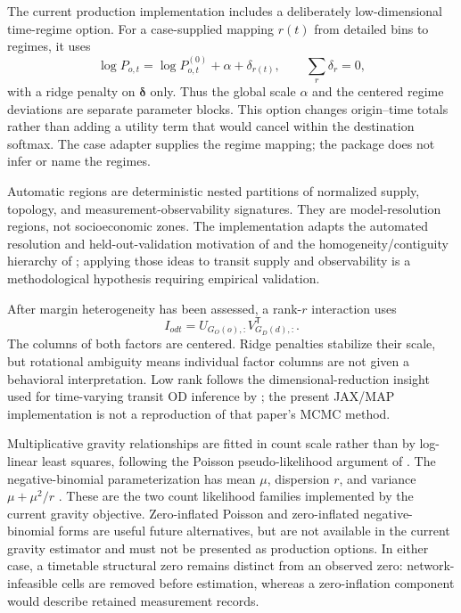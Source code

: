 The current production implementation includes a deliberately low-dimensional
time-regime option.  For a case-supplied mapping $r(t)$ from detailed bins to
regimes, it uses
\[
    \log P_{o,t}=\log P^{(0)}_{o,t}+\alpha+\delta_{r(t)},
    \qquad \sum_r\delta_r=0,
\]
with a ridge penalty on $\bm\delta$ only.  Thus the global scale $\alpha$ and
the centered regime deviations are separate parameter blocks.  This option
changes origin--time totals rather than adding a utility term that would cancel
within the destination softmax.  The case adapter supplies the regime mapping;
the package does not infer or name the regimes.

Automatic regions are deterministic nested partitions of normalized supply,
topology, and measurement-observability signatures.  They are model-resolution
regions, not socioeconomic zones.  The implementation adapts the automated
resolution and held-out-validation motivation of \cite{MenonEtAl2015} and the
homogeneity/contiguity hierarchy of \cite{YuanEtAl2019}; applying those ideas to
transit supply and observability is a methodological hypothesis requiring
empirical validation.

After margin heterogeneity has been assessed, a rank-$r$ interaction uses
\[
 I_{odt}=U_{G_O(o),:}V_{G_D(d),:}^{\mathsf T}.
\]
The columns of both factors are centered.  Ridge penalties stabilize their
scale, but rotational ambiguity means individual factor columns are not given
a behavioral interpretation.  Low rank follows the dimensional-reduction
insight used for time-varying transit OD inference by \cite{ChenChengSun2025};
the present JAX/MAP implementation is not a reproduction of that paper's MCMC
method.

Multiplicative gravity relationships are fitted in count scale rather than by
log-linear least squares, following the Poisson pseudo-likelihood argument of
\cite{SantosSilvaTenreyro2006}.  The negative-binomial parameterization has
mean $\mu$, dispersion $r$, and variance $\mu+\mu^2/r$
\cite{CameronTrivedi2013}.  These are the two count likelihood families
implemented by the current gravity objective.  Zero-inflated Poisson and
zero-inflated negative-binomial forms are useful future alternatives, but are
not available in the current gravity estimator and must not be presented as
production options.  In either case, a timetable structural zero remains
distinct from an observed zero: network-infeasible cells are removed before
estimation, whereas a zero-inflation component would describe retained
measurement records.

